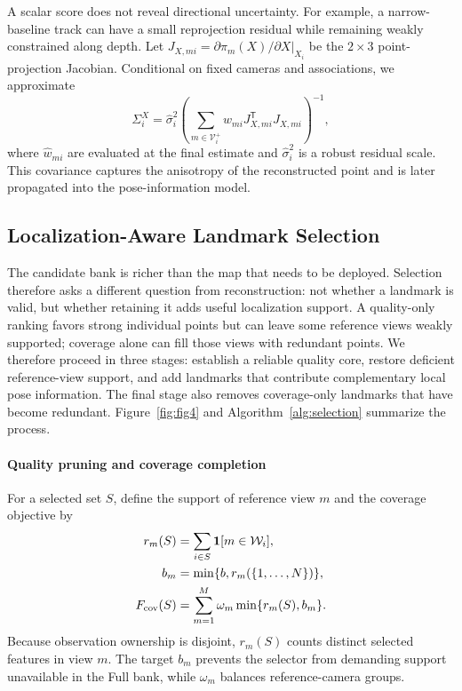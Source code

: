 A scalar score does not reveal directional uncertainty. For example, a narrow-baseline track can have a small reprojection residual while remaining weakly constrained along depth. Let $J_{X,mi}=\left.\partial\pi_m(X)/\partial X\right|_{X_i}$ be the $2\times3$ point-projection Jacobian. Conditional on fixed cameras and associations, we approximate
\begin{equation}
\Sigma_i^X=\widehat\sigma_i^2
\left(\sum_{m\in\mathcal V_i^+}\widehat w_{mi}
J_{X,mi}^{\mathsf T}J_{X,mi}\right)^{-1},
\label{eq:pointcov}
\end{equation}
where $\widehat w_{mi}$ are evaluated at the final estimate and $\widehat\sigma_i^2$ is a robust residual scale. This covariance captures the anisotropy of the reconstructed point and is later propagated into the pose-information model.

\subsection{Localization-Aware Landmark Selection}
\label{sec:selection}


The candidate bank is richer than the map that needs to be deployed. Selection therefore asks a different question from reconstruction: not whether a landmark is valid, but whether retaining it adds useful localization support. A quality-only ranking favors strong individual points but can leave some reference views weakly supported; coverage alone can fill those views with redundant points. We therefore proceed in three stages: establish a reliable quality core, restore deficient reference-view support, and add landmarks that contribute complementary local pose information. The final stage also removes coverage-only landmarks that have become redundant. Figure~\ref{fig:fig4} and Algorithm~\ref{alg:selection} summarize the process.

\paragraph{Quality pruning and coverage completion}
For a selected set $S$, define the support of reference view $m$ and the coverage objective by
\begin{equation}
\begin{aligned}
r_m(S)&=\sum_{i\in S}\mathbf 1[m\in\mathcal W_i],\\
b_m&=\min\{b,r_m(\{1,\ldots,N\})\},\\
F_{\rm cov}(S)&=\sum_{m=1}^{M}\omega_m\min\{r_m(S),b_m\}.
\end{aligned}
\label{eq:matchobjective}
\end{equation}
Because observation ownership is disjoint, $r_m(S)$ counts distinct selected features in view $m$. The target $b_m$ prevents the selector from demanding support unavailable in the Full bank, while $\omega_m$ balances reference-camera groups.

